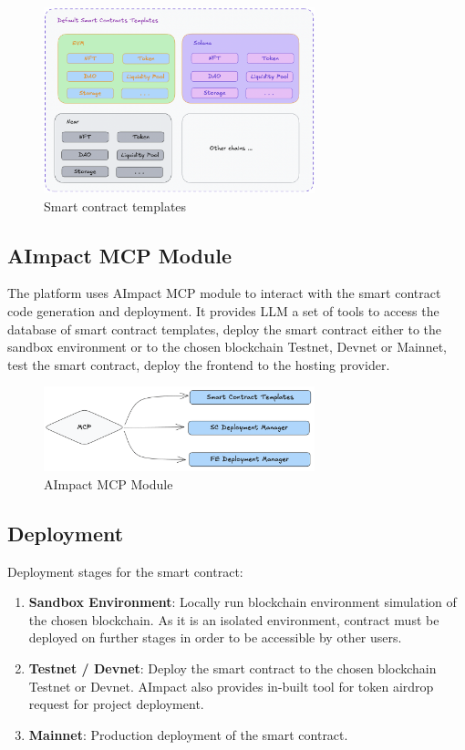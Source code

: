 \documentclass[12pt,a4paper]{article}
\begin{document}
\begin{figure}[h]
    \centering
    \includegraphics[width=0.7\textwidth]{imgs/templates.png}
    \caption{Smart contract templates}
    \label{fig:templates}
\end{figure}


\subsection{AImpact MCP Module}

The platform uses AImpact MCP module to interact with the smart contract code generation and deployment. It provides LLM a set of tools to
access the database of smart contract templates, deploy the smart contract either to the sandbox environment or to the chosen blockchain Testnet, 
Devnet or Mainnet, test the smart contract, deploy the frontend to the hosting provider.

\begin{figure}[h]
    \centering
    \includegraphics[width=0.7\textwidth]{imgs/mcp.png}
    \caption{AImpact MCP Module}
    \label{fig:mcp}
\end{figure}


\subsection{Deployment}

Deployment stages for the smart contract:
\begin{enumerate}
    \item \textbf{Sandbox Environment}: Locally run blockchain environment simulation of the chosen blockchain. 
    As it is an isolated environment, contract must be deployed on further stages in order to be accessible by other users.
    \item \textbf{Testnet / Devnet}: Deploy the smart contract to the chosen blockchain Testnet or Devnet. 
    AImpact also provides in-built tool for token airdrop request for project deployment.
    \item \textbf{Mainnet}: Production deployment of the smart contract.
\end{enumerate}
\end{document}
